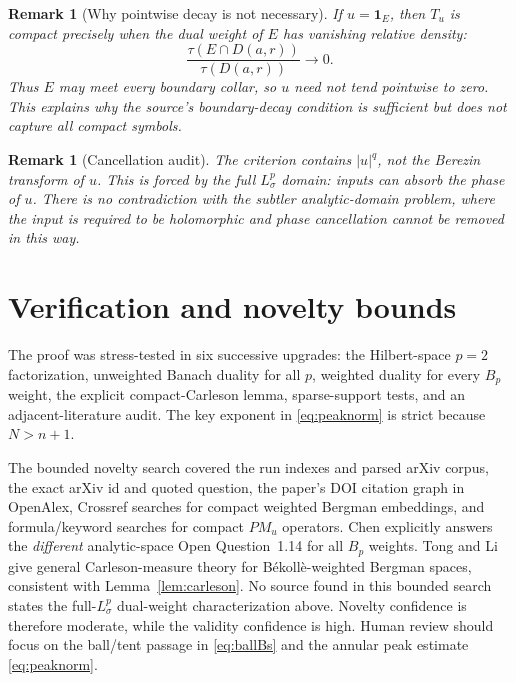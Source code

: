 \documentclass[11pt]{article}
\newtheorem{remark}[theorem]{Remark}
\begin{document}
\begin{remark}[Why pointwise decay is not necessary]
If $u=\mathbf1_E$, then $T_u$ is compact precisely when the dual weight of
$E$ has vanishing relative density:
\[
 \frac{\tau(E\cap D(a,r))}{\tau(D(a,r))}\longrightarrow0.
\]
Thus $E$ may meet every boundary collar, so $u$ need not tend pointwise to
zero.  This explains why the source's boundary-decay condition is
sufficient but does not capture all compact symbols.
\end{remark}

\begin{remark}[Cancellation audit]
The criterion contains $|u|^q$, not the Berezin transform of $u$.  This is
forced by the full $L^p_\sigma$ domain: inputs can absorb the phase of $u$.
There is no contradiction with the subtler analytic-domain problem, where
the input is required to be holomorphic and phase cancellation cannot be
removed in this way.
\end{remark}

\section{Verification and novelty bounds}

The proof was stress-tested in six successive upgrades: the Hilbert-space
$p=2$ factorization, unweighted Banach duality for all $p$, weighted duality
for every $B_p$ weight, the explicit compact-Carleson lemma, sparse-support
tests, and an adjacent-literature audit.  The key exponent in
\eqref{eq:peaknorm} is strict because $N>n+1$.

The bounded novelty search covered the run indexes and parsed arXiv corpus,
the exact arXiv id and quoted question, the paper's DOI citation graph in
OpenAlex, Crossref searches for compact weighted Bergman embeddings, and
formula/keyword searches for compact $P M_u$ operators.  Chen
\cite{Chen} explicitly answers the \emph{different} analytic-space Open
Question~1.14 for all $B_p$ weights.  Tong and Li \cite{TL} give general
Carleson-measure theory for B\'ekoll\`e-weighted Bergman spaces, consistent
with Lemma~\ref{lem:carleson}.  No source found in this bounded search states
the full-$L^p_\sigma$ dual-weight characterization above.  Novelty confidence
is therefore moderate, while the validity confidence is high.  Human review
should focus on the ball/tent passage in \eqref{eq:ballBs} and the annular
peak estimate \eqref{eq:peaknorm}.
\end{document}
